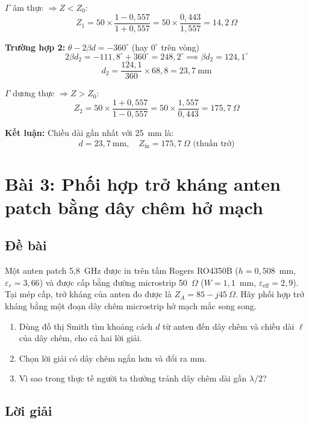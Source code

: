 \documentclass[12pt,a4paper]{article}
\begin{document}
$\Gamma$ âm thực $\Rightarrow Z < Z_0$:
\[
Z_1 = 50 \times \frac{1 - 0{,}557}{1 + 0{,}557} = 50 \times \frac{0{,}443}{1{,}557} = 14{,}2~\Omega
\]

\textbf{Trường hợp 2:} $\theta - 2\beta d = -360^\circ$ (hay $0^\circ$ trên vòng)
\[
2\beta d_2 = -111{,}8^\circ + 360^\circ = 248{,}2^\circ \implies \beta d_2 = 124{,}1^\circ
\]
\[
d_2 = \frac{124{,}1}{360} \times 68{,}8 = 23{,}7~\text{mm}
\]

$\Gamma$ dương thực $\Rightarrow Z > Z_0$:
\[
Z_2 = 50 \times \frac{1 + 0{,}557}{1 - 0{,}557} = 50 \times \frac{1{,}557}{0{,}443} = 175{,}7~\Omega
\]

\textbf{Kết luận:} Chiều dài gần nhất với 25~mm là:
\[
\boxed{d = 23{,}7~\text{mm}, \quad Z_{\text{in}} = 175{,}7~\Omega \text{ (thuần trở)}}
\]

\newpage
\section{Bài 3: Phối hợp trở kháng anten patch bằng dây chêm hở mạch}

\subsection{Đề bài}
Một anten patch 5,8~GHz được in trên tấm Rogers RO4350B ($h = 0{,}508$~mm, $\varepsilon_r = 3{,}66$) và được cấp bằng đường microstrip 50~$\Omega$ ($W = 1{,}1$~mm, $\varepsilon_{\text{eff}} = 2{,}9$). Tại mép cấp, trở kháng của anten đo được là $Z_A = 85 - j45~\Omega$. Hãy phối hợp trở kháng bằng một đoạn dây chêm microstrip hở mạch mắc song song.

\begin{enumerate}[label=(\alph*)]
    \item Dùng đồ thị Smith tìm khoảng cách $d$ từ anten đến dây chêm và chiều dài $\ell$ của dây chêm, cho cả hai lời giải.
    \item Chọn lời giải có dây chêm ngắn hơn và đổi ra mm.
    \item Vì sao trong thực tế người ta thường tránh dây chêm dài gần $\lambda/2$?
\end{enumerate}

\subsection{Lời giải}
\end{document}
